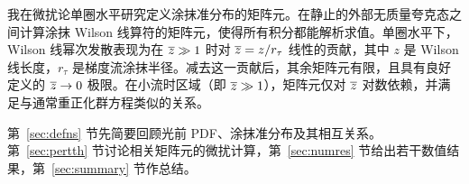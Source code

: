 我在微扰论单圈水平研究定义涂抹准分布的矩阵元。在静止的外部无质量夸克态之间计算涂抹 Wilson 线算符的矩阵元，使得所有积分都能解析求值。单圈水平下，Wilson 线幂次发散表现为在 $\overline{z} \gg 1$ 时对 $\overline{z} = z/r_\tau$ 线性的贡献，其中 $z$ 是 Wilson 线长度，$r_\tau$ 是梯度流涂抹半径。减去这一贡献后，其余矩阵元有限，且具有良好定义的 $\overline{z}\to0$ 极限。在小流时区域（即 $\overline{z} \gg 1$），矩阵元仅对 $\overline{z}$ 对数依赖，并满足与通常重正化群方程类似的关系。

第~\ref{sec:defns} 节先简要回顾光前 PDF、涂抹准分布及其相互关系。第~\ref{sec:pertth} 节讨论相关矩阵元的微扰计算，第~\ref{sec:numres} 节给出若干数值结果，第~\ref{sec:summary} 节作总结。
